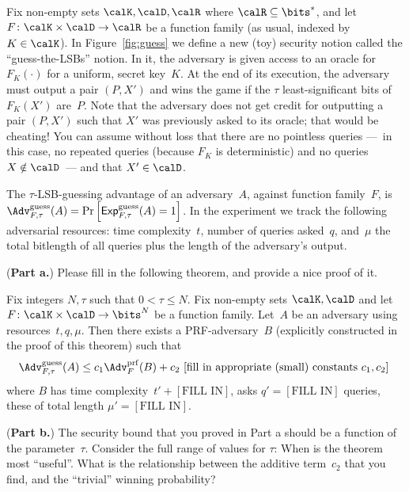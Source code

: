 \documentclass[11pt]{article}
\newcommand{\Prob}[1]{\Pr\left[#1\right]}
\newcommand{\AdvPRF}[2]{\Adv^{\mathrm{prf}}_{#1}(#2)}
\newcommand{\ExpGuess}[2]{\mathsf{Exp}^{\mathrm{guess}}_{#1}{(#2)}}
\newcommand{\AdvGuess}[2]{\Adv^{\mathrm{guess}}_{#1}(#2)}
\begin{document}
Fix non-empty sets $\calK,\calD,\calR$ where $\calR \subseteq
\bits^*$, and let $F \colon \calK \times
\calD \to \calR$ be a function family (as usual, indexed by
$K\in\calK$).  In Figure~\ref{fig:guess} we define a new (toy) security
notion called the ``guess-the-LSBs'' notion.  In it, the adversary is
given access to an oracle for $F_K(\cdot)$ for a uniform, secret
key~$K$.  At the end of its execution, the adversary must output a
pair $(P,X')$ and wins the game if the $\tau$ least-significant bits
of $F_K(X')$ are~$P$.
Note that the
adversary does not get credit for outputting a pair $(P,X')$ such
that $X'$ was previously asked to its oracle; that would be cheating!
You can assume without loss that there are no pointless queries ---~in this case, no repeated
queries (because $F_K$ is deterministic) and no queries $X \notin
\calD$~--- and that $X' \in \calD$.

The $\tau$-LSB-guessing advantage of an adversary~$A$, against
function family~$F$, is
$\AdvGuess{F,\tau}{A}=\Prob{\ExpGuess{F,\tau}{A}=1}$.  
In the experiment we track the following adversarial resources: time
complexity~$t$, number of queries asked~$q$, and~$\mu$ the total
bitlength of all queries plus the length of the adversary's output.

({\bf Part a.}) Please fill in the following theorem, and provide a nice proof of it.

\begin{theorem}
Fix integers $N,\tau$ such that $0 < \tau \leq N$.
Fix non-empty sets $\calK,\calD$ and let $F \colon \calK \times
\calD \to \bits^N$ be a function family.  Let~$A$ be an adversary
using resources~$t,q,\mu$.  Then there exists a PRF-adversary~$B$
(explicitly constructed in the proof of this theorem) such that
\[
\AdvGuess{F,\tau}{A} \leq c_1\AdvPRF{F}{B} + c_2 \mbox{   [fill in
  appropriate (small) constants $c_1,c_2$] }
\]
where $B$ has time complexity~$t'+[\mbox{FILL IN}]$,
asks $q'=[\mbox{FILL IN}]$ queries, these of total length
$\mu'=[\mbox{FILL IN}]$.
\end{theorem}

({\bf Part b.})  The security bound that you proved in Part a should be a
function of the parameter~$\tau$.  Consider the full range of values
for $\tau$: When is the theorem most ``useful''.  What is the
relationship between the additive term~$c_2$ that you find, and the
``trivial'' winning probability?

\end{document}
